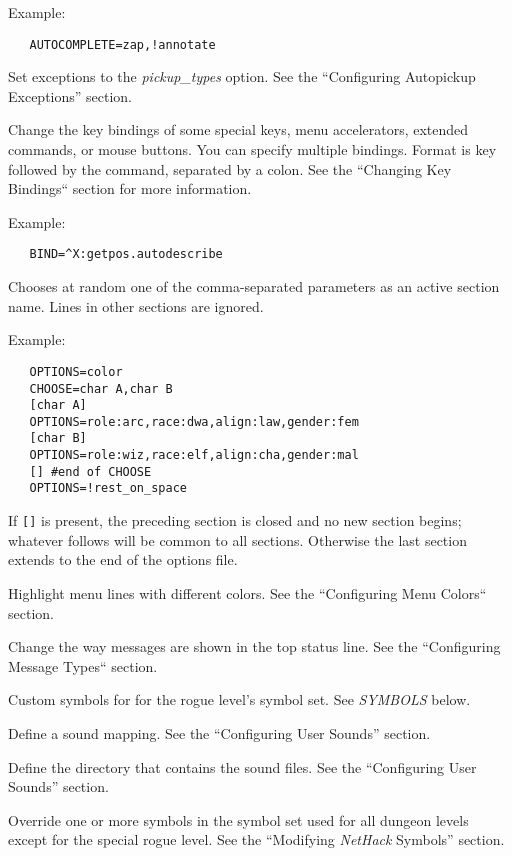 Example:
\begin{verbatim}
   AUTOCOMPLETE=zap,!annotate
\end{verbatim}

\item[\bb{AUTOPICKUP\_EXCEPTION}]
Set exceptions to the {{\it pickup\_types\/}}
option. See the ``Configuring Autopickup Exceptions'' section.
\item[\bb{BINDINGS}]
Change the key bindings of some special keys, menu accelerators,
extended commands, or mouse buttons. You can specify multiple bindings.
Format is key followed by the command, separated by a colon.
See the ``Changing Key Bindings`` section for more information.

Example:
\begin{verbatim}
   BIND=^X:getpos.autodescribe
\end{verbatim}

\item[\bb{CHOOSE}]
Chooses at random one of the comma-separated parameters as an active
section name.
Lines in other sections are ignored.

Example:
\begin{verbatim}
   OPTIONS=color
   CHOOSE=char A,char B
   [char A]
   OPTIONS=role:arc,race:dwa,align:law,gender:fem
   [char B]
   OPTIONS=role:wiz,race:elf,align:cha,gender:mal
   [] #end of CHOOSE
   OPTIONS=!rest_on_space
\end{verbatim}

If {\tt []} is present, the preceding section is closed and no new
section begins; whatever follows will be common to all sections.
Otherwise the last section extends to the end of the options file.

\item[\bb{MENUCOLOR}]
Highlight menu lines with different colors.
See the ``Configuring Menu Colors`` section.
\item[\bb{MSGTYPE}]
Change the way messages are shown in the top status line.
See the ``Configuring Message Types`` section.
\item[\bb{ROGUESYMBOLS}]
Custom symbols for for the rogue level's symbol set.
See {\it SYMBOLS} below.
\item[\bb{SOUND}]
Define a sound mapping.
See the ``Configuring User Sounds'' section.
\item[\bb{SOUNDDIR}]
Define the directory that contains the sound files.
See the ``Configuring User Sounds'' section.
\item[\bb{SYMBOLS}]
Override one or more symbols in the symbol set used for all dungeon
levels except for the special rogue level.
See the ``Modifying {\it NetHack\/} Symbols'' section.


